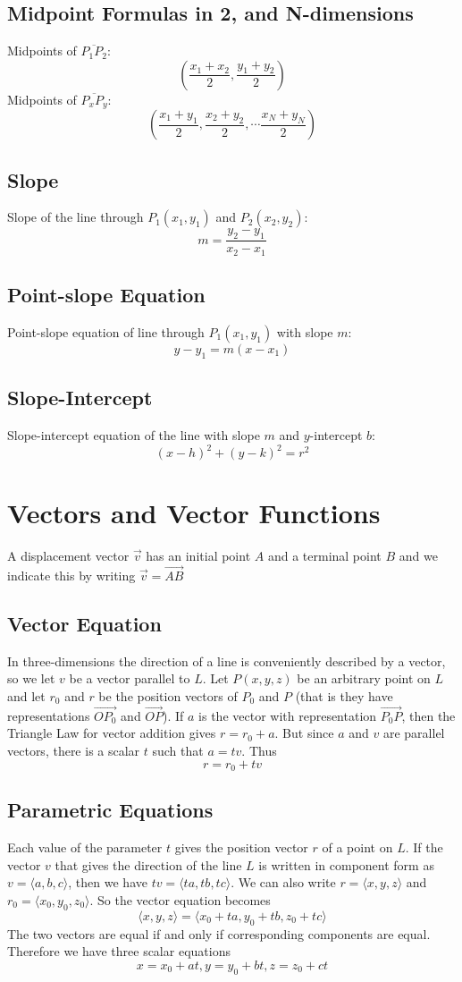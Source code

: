 \documentclass[10pt]{report}
\begin{document}
\subsection{Midpoint Formulas in 2, and N-dimensions}
Midpoints of $\overline{P_1P_2}$: $$\left(\frac{x_1+x_2}{2},\frac{y_1+y_2}{2}\right)$$
Midpoints of $\overline{P_xP_y}$: $$\left(\frac{x_1+y_1}{2},\frac{x_2+y_2}{2},\cdots\frac{x_N+y_N}{2}\right)$$
\subsection{Slope}
Slope of the line through $P_1(x_1,y_1)$ and $P_2(x_2,y_2)$:
$$m=\frac{y_2-y_1}{x_2-x_1}$$
\subsection{Point-slope Equation}
Point-slope equation of line through $P_1(x_1, y_1)$ with slope $m$:
$$y-y_1=m(x-x_1)$$
\subsection{Slope-Intercept}
Slope-intercept equation of the line with slope $m$ and $y$-intercept $b$:
$$(x-h)^2+(y-k)^2=r^2$$
\section{Vectors and Vector Functions}
A displacement vector $\vec{v}$ has an initial point $A$ and a terminal point $B$  and we indicate this by writing $\vec{v}=\vec{AB}$
\subsection{Vector Equation}
In three-dimensions the direction of a line is conveniently described by a vector, so we let $v$ be a vector parallel to $L$. Let $P(x,y,z)$ be an arbitrary point on $L$ and let $r_0$ and $r$ be the position vectors of $P_0$ and $P$ (that is they have representations $\vec{OP_0}$ and $\vec{OP}$). If $a$ is the vector with representation $\vec{P_0P}$, then the Triangle Law for vector addition gives $r = r_0 + a$. But since $a$ and $v$ are parallel vectors, there is a scalar $t$ such that $a=tv$. Thus
$$r = r_0 + tv$$
\subsection{Parametric Equations}
Each value of the parameter $t$ gives the position vector $r$ of a point on $L$. If the vector $v$ that gives the direction of the line $L$ is written in component form as $v=\langle a,b,c\rangle$, then we have $tv=\langle ta,tb,tc\rangle$. We can also write $r=\langle x,y,z\rangle$ and $r_0=\langle x_0,y_0,z_0\rangle$. So the vector equation becomes
$$\langle x,y,z\rangle = \langle x_0 + ta, y_0 + tb, z_0 + tc\rangle$$
The two vectors are equal if and only if corresponding components are equal. Therefore we have three scalar equations
$$x = x_0 + at, y= y_0 + bt, z = z_0 + ct$$
\end{document}
